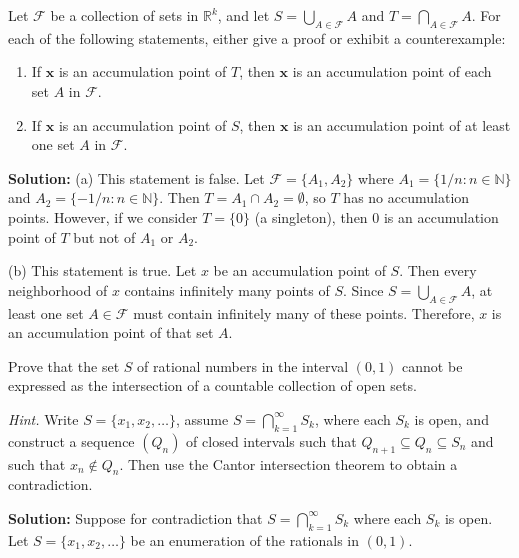 \begin{problembox}            
Let $\mathcal{F}$ be a collection of sets in $\mathbb{R}^k$, and let $S = \bigcup_{A \in \mathcal{F}} A$ and $T = \bigcap_{A \in \mathcal{F}} A$. For each of the following statements, either give a proof or exhibit a counterexample:
\begin{enumerate}[label=\alph*)]
\item If $\mathbf{x}$ is an accumulation point of $T$, then $\mathbf{x}$ is an accumulation point of each set $A$ in $\mathcal{F}$.
\item If $\mathbf{x}$ is an accumulation point of $S$, then $\mathbf{x}$ is an accumulation point of at least one set $A$ in $\mathcal{F}$.
\end{enumerate}
\end{problembox}

\textbf{Solution:} 
(a) This statement is false. Let $\mathcal{F} = \{A_1, A_2\}$ where $A_1 = \{1/n : n \in \mathbb{N}\}$ and $A_2 = \{-1/n : n \in \mathbb{N}\}$. Then $T = A_1 \cap A_2 = \emptyset$, so $T$ has no accumulation points. However, if we consider $T = \{0\}$ (a singleton), then $0$ is an accumulation point of $T$ but not of $A_1$ or $A_2$.

(b) This statement is true. Let $x$ be an accumulation point of $S$. Then every neighborhood of $x$ contains infinitely many points of $S$. Since $S = \bigcup_{A \in \mathcal{F}} A$, at least one set $A \in \mathcal{F}$ must contain infinitely many of these points. Therefore, $x$ is an accumulation point of that set $A$.

\begin{problembox}
Prove that the set \( S \) of rational numbers in the interval \( (0, 1) \) cannot be expressed as the intersection of a countable collection of open sets. 

\textit{Hint.} Write \( S = \{x_1, x_2, \ldots\} \), assume \( S = \bigcap_{k=1}^{\infty} S_k \), where each \( S_k \) is open, and construct a sequence \( (Q_n) \) of closed intervals such that \( Q_{n+1} \subseteq Q_n \subseteq S_n \) and such that \( x_n \notin Q_n \). Then use the Cantor intersection theorem to obtain a contradiction.
\end{problembox}

\textbf{Solution:} Suppose for contradiction that $S = \bigcap_{k=1}^{\infty} S_k$ where each $S_k$ is open. Let $S = \{x_1, x_2, \ldots\}$ be an enumeration of the rationals in $(0,1)$.

